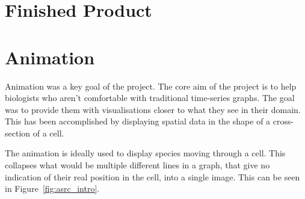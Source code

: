 
\section{Finished Product}

\section{Animation}
\label{sec:animation}

Animation was a key goal of the project.  The core aim of the project is to help biologists who aren't comfortable with traditional time-series graphs.  The goal was to provide them with visualisations closer to what they see in their domain.  This has been accomplished by displaying spatial data in the shape of a cross-section of a cell.

The animation is ideally used to display species moving through a cell.  This collapses what would be multiple different lines in a graph, that give no indication of their real position in the cell, into a single image.  This can be seen in Figure~\ref{fig:asrc_intro}.

